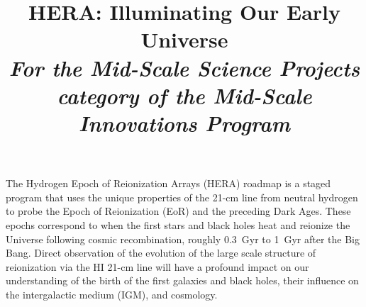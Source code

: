 \documentclass[preprint]{aastex}
\def\HI{{H{\small I }}}
\begin{document}
\title{HERA: Illuminating Our Early Universe\\
{\it For the Mid-Scale Science Projects category of the Mid-Scale Innovations Program}} 



{ \setlength{\parindent}{0cm}
The Hydrogen Epoch of Reionization Arrays (HERA) roadmap is a staged 
program that uses the unique properties of the 21-cm line from neutral 
hydrogen to probe the 
Epoch of Reionization (EoR) and the preceding Dark Ages.  
These epochs
correspond to
when the first stars and black holes heat and reionize the
Universe following cosmic recombination, roughly
0.3~Gyr to 1~Gyr after the Big Bang. 
Direct observation of the evolution of the
large scale structure of reionization via the \HI 21-cm line will have a profound impact on our
understanding of the birth of the first galaxies and black holes, their
influence on the intergalactic medium (IGM), and cosmology.}  
\end{document}
